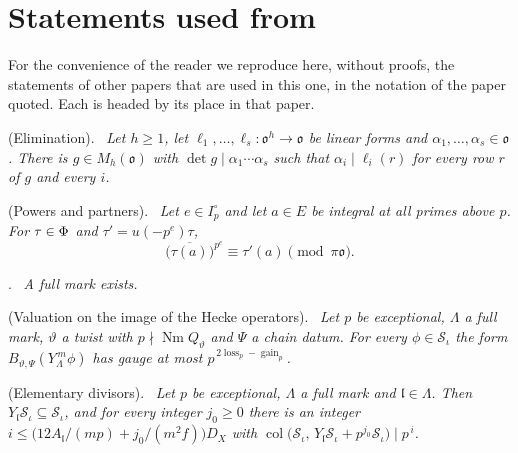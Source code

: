 \documentclass[10pt]{amsart}
\theoremstyle{definition}
\theoremstyle{remark}
\providecommand{\auDX}{D_X}
\providecommand{\auNm}{\operatorname{Nm}}
\providecommand{\auS}{\mathcal S}
\providecommand{\aubar}[1]{\overline{#1}}
\providecommand{\aucol}{\operatorname{col}}
\providecommand{\augain}{\operatorname{gain}}
\providecommand{\paI}{I_p^{\circ}}
\providecommand{\paloss}{\operatorname{loss}}
\providecommand{\pao}{\mathfrak o}
\newenvironment{quotedthm}[2]{\par\medskip\noindent\begingroup
  \textbf{#1}#2.\ \itshape\ignorespaces}{\endgroup\par\medskip}
\begin{document}
\appendix

\section{Statements used from \texorpdfstring{\cite{P49}}{[P49]}}\label{A2:quoted}

For the convenience of the reader we reproduce here, without proofs, the statements of other papers that are used in this one, in the notation of the paper quoted. Each is headed by its place in that paper.

\begin{quotedthm}{\cite[Lemma~4.2]{P49}}{ (Elimination)}
Let $h\ge1$, let $\ell_1,\dots,\ell_s\colon\pao^h\to\pao$ be linear forms and
$\alpha_1,\dots,\alpha_s\in\pao$. There is $g\in M_h(\pao)$ with $\det g\mid\alpha_1\cdots\alpha_s$
such that $\alpha_i\mid\ell_i(r)$ for every row $r$ of $g$ and every $i$.
\end{quotedthm}

\begin{quotedthm}{\cite[Lemma~4.11]{P49}}{ (Powers and partners)}
Let $e\in\paI$ and let $a\in E$ be integral at all primes above $p$. For $\tau\in\Phi$ and
$\tau'=u(-p^e)\tau$,
\[
\bigl(\aubar{\tau(a)}\bigr)^{p^e}\equiv\tau'(a)\pmod{\pi\pao}.
\]
\end{quotedthm}

\begin{quotedthm}{\cite[Lemma~4.17]{P49}}{}
A full mark exists.
\end{quotedthm}

\begin{quotedthm}{\cite[Lemma~4.18]{P49}}{ (Valuation on the image of the Hecke operators)}
Let $p$ be exceptional, $\Lambda$ a full mark, $\vartheta$ a twist with $p\nmid\auNm Q_\vartheta$
and $\Psi$ a chain datum. For every $\phi\in\auS_\iota$ the form
$B_{\vartheta,\Psi}(Y_\Lambda^{\,m}\phi)$ has gauge at most $p^{\,2\paloss_p-\augain_p}$.
\end{quotedthm}

\begin{quotedthm}{\cite[Lemma~4.19]{P49}}{ (Elementary divisors)}
Let $p$ be exceptional, $\Lambda$ a full mark and $\mathfrak l\in\Lambda$. Then
$Y_{\mathfrak l}\auS_\iota\subseteq\auS_\iota$, and for every integer $j_0\ge0$ there is an integer
$i\le\bigl(12A_{\mathfrak l}/(mp)+j_0/(m^2f)\bigr)\auDX$ with
$\aucol\bigl(\auS_\iota,\,Y_{\mathfrak l}\auS_\iota+p^{j_0}\auS_\iota\bigr)\mid p^{\,i}$.
\end{quotedthm}
\end{document}
